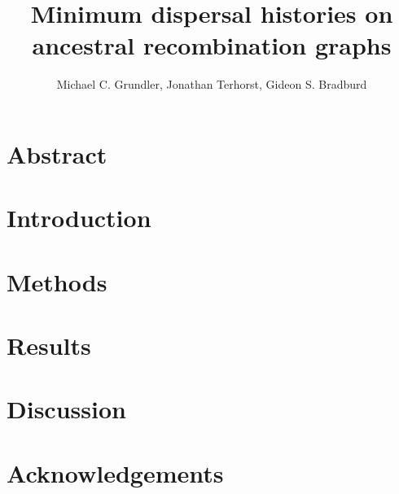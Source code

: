 \documentclass[12pt, letterpaper]{article}
\title{Minimum dispersal histories on ancestral recombination graphs}
\author{Michael C. Grundler, Jonathan Terhorst, Gideon S. Bradburd}
\begin{document}
\maketitle

\begin{linenumbers}

\section*{Abstract}


\section{Introduction}


\section{Methods}


\section{Results}


\section{Discussion}


\section*{Acknowledgements}




\end{linenumbers}
\end{document}
